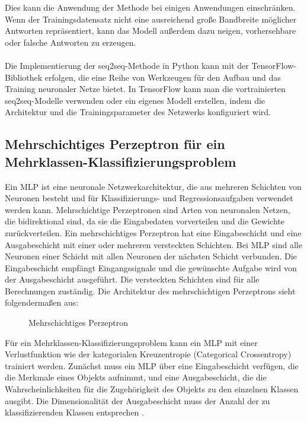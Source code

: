 Dies kann die Anwendung der Methode bei einigen Anwendungen einschränken. 
Wenn der Trainingsdatensatz nicht eine ausreichend große Bandbreite möglicher Antworten repräsentiert, kann das Modell außerdem dazu neigen, vorhersehbare oder falsche Antworten zu erzeugen.\\\\
Die Implementierung der seq2seq-Methode in Python kann mit der TensorFlow-Bibliothek erfolgen, die eine Reihe von Werkzeugen für den Aufbau und das Training neuronaler Netze bietet. 
In TensorFlow kann man die vortrainierten seq2seq-Modelle verwenden oder ein eigenes Modell erstellen, indem die Architektur und die Trainingsparameter des Netzwerks konfiguriert wird. \cite{tensorflow}
\subsection{Mehrschichtiges Perzeptron für ein Mehrklassen-Klassifizierungsproblem}
Ein \ac{MLP} ist eine neuronale Netzwerkarchitektur, die aus mehreren Schichten von Neuronen besteht und für Klassifizierungs- und Regressionsaufgaben verwendet werden kann. 
Mehrschichtige Perzeptronen sind Arten von neuronalen Netzen, die bidirektional sind, da sie die Eingabedaten vorverteilen und die Gewichte zurückverteilen. 
Ein mehrschichtiges Perzeptron hat eine Eingabeschicht und eine Ausgabeschicht mit einer oder mehreren versteckten Schichten. 
Bei \ac{MLP} sind alle Neuronen einer Schicht mit allen Neuronen der nächsten Schicht verbunden. 
Die Eingabeschicht empfängt Eingangssignale und die gewünschte Aufgabe wird von der Ausgabeschicht ausgeführt. 
Die versteckten Schichten sind für alle Berechnungen zuständig. 
Die Architektur des mehrschichtigen Perzeptrons sieht folgendermaßen aus:
\begin{figure}[H]
    \centering
    \caption{\label{figure:Mehrschichtiges_Perzeptron}Mehrschichtiges Perzeptron}
\end{figure}
\noindent
Für ein Mehrklassen-Klassifizierungsproblem kann ein \ac{MLP} mit einer Verlustfunktion wie der kategorialen Kreuzentropie (Categorical Crossentropy) trainiert werden. 
Zunächst muss ein \ac{MLP} über eine Eingabeschicht verfügen, die die Merkmale eines Objekts aufnimmt, und eine Ausgabeschicht, die die Wahrscheinlichkeiten für die Zugehörigkeit des Objekts zu den einzelnen Klassen ausgibt. 
Die Dimensionalität der Ausgabeschicht muss der Anzahl der zu klassifizierenden Klassen entsprechen \cite{goodfellow_deep_2016}.
